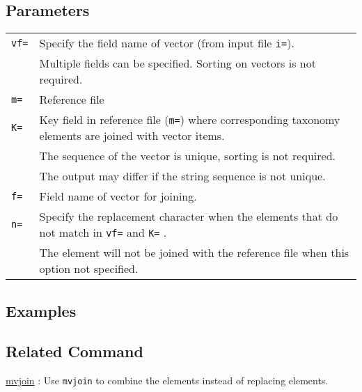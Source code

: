 \subsection*{Parameters}
\begin{table}[htbp]
{\small
\begin{tabular}{ll}
\verb|vf=| & Specify the field name of vector (from input file \verb|i=|). \\
           & Multiple fields can be specified. Sorting on vectors is not required. \\
\verb|m=|  & Reference file  \\
\verb|K=|  &  Key field in reference file (\verb|m=|) where corresponding taxonomy elements are joined with vector items. \\
           & The sequence of the vector is unique, sorting is not required. \\
           & The output may differ if the string sequence is not unique.  \\ 
\verb|f=|  & Field name of vector for joining.\\
\verb|n=|  & Specify the replacement character when the elements that do not match in \verb|vf=| and \verb|K=| . \\
& The element will not be joined with the reference file when this option not specified.  \\
\end{tabular}
}
\end{table} 


\subsection*{Examples}


\subsection*{Related Command}
\hyperref[sect:mvjoin]{mvjoin} : Use \verb|mvjoin| to combine the elements instead of replacing elements. 

%
